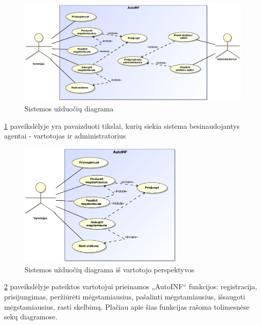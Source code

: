 \documentclass[12pt]{article}
\begin{document}
	\begin{figure}[h]
		\begin{center}
			\includegraphics[width=\textwidth]{Tikslai.eps}
			\caption{Sistemos užduočių diagrama\label{UseCase}}
		\end{center}
	\end{figure}
	
	\ref{UseCase} paveikslėlyje yra pavaizduoti tikslai, kurių siekia sistema besinaudojantys agentai - vartotojas ir administratorius
	\pagebreak

	\begin{figure}[h]
		\begin{center}
			\includegraphics[width=0.7\textwidth]{TikslaiVartotojas.eps}
			\caption{Sistemos užduočių diagrama iš vartotojo perspektyvos\label{UseCaseUser}}
		\end{center}
	\end{figure}
	
	\ref{UseCaseUser} paveikslėlyje pateiktos vartotojui prieinamos „AutoINF“ funkcijos: registracija, prisijungimas, peržiūrėti mėgstamiausius, pašalinti mėgstamiausius, išsaugoti mėgstamiausius, rasti skelbimą. Plačiau apie šias funkcijas rašoma tolimesnėse sekų diagramose.
	\pagebreak	
	
\end{document}
